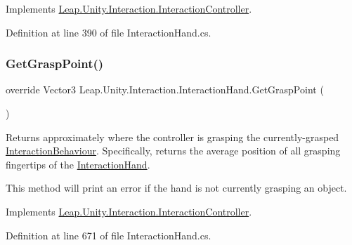 Implements \mbox{\hyperlink{class_leap_1_1_unity_1_1_interaction_1_1_interaction_controller_ae5ccd0183ff87fd51107a5b082116ce0}{Leap.\+Unity.\+Interaction.\+Interaction\+Controller}}.



Definition at line 390 of file Interaction\+Hand.\+cs.

\mbox{\label{class_leap_1_1_unity_1_1_interaction_1_1_interaction_hand_ad3db830a66914a000a05003b36b4596d}} 
\subsubsection{\texorpdfstring{GetGraspPoint()}{GetGraspPoint()}}
{\footnotesize\ttfamily override Vector3 Leap.\+Unity.\+Interaction.\+Interaction\+Hand.\+Get\+Grasp\+Point (\begin{DoxyParamCaption}{ }\end{DoxyParamCaption})\hspace{0.3cm}{\ttfamily [virtual]}}



Returns approximately where the controller is grasping the currently-\/grasped \mbox{\hyperlink{class_leap_1_1_unity_1_1_interaction_1_1_interaction_behaviour}{Interaction\+Behaviour}}. Specifically, returns the average position of all grasping fingertips of the \mbox{\hyperlink{class_leap_1_1_unity_1_1_interaction_1_1_interaction_hand}{Interaction\+Hand}}. 

This method will print an error if the hand is not currently grasping an object. 

Implements \mbox{\hyperlink{class_leap_1_1_unity_1_1_interaction_1_1_interaction_controller_aca84a24dd5f2f73a7c8bee6a15cea0a4}{Leap.\+Unity.\+Interaction.\+Interaction\+Controller}}.



Definition at line 671 of file Interaction\+Hand.\+cs.

\mbox{\label{class_leap_1_1_unity_1_1_interaction_1_1_interaction_hand_a01581c96fd67f53a9b8a6ddc36e0709c}} 
